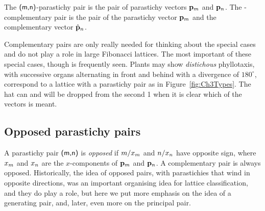\begin{definition}
The $\textsf{(m,n)}$-parastichy pair is the pair of parastichy vectors ${\mathbf p}_{m}$ and ${\mathbf p}_{n}$.
The -complementary pair is the pair of the parastichy vector ${\mathbf p}_{m}$ and the complementary vector $\hat{\mathbf p}_{n}$.
\label{def:pp}
\end{definition}
Complementary pairs are only really needed for thinking about the special cases  and do not play a role in large Fibonacci lattices. The most important of these special cases, though is frequently seen. Plants may show \textit{distichous} phyllotaxis, with successive organs  alternating in front and behind with a divergence of $180^\circ$, correspond to a lattice with a  parastichy pair as in Figure~\ref{fig:Ch3Types}. The  hat can and will be dropped from the second \textsf{1} when it is clear which of the vectors is meant. 

\clearpage
\subsection{Opposed parastichy pairs}

A parastichy pair $\textsf{(m,n)}$ is \emph{opposed} if $m/x_m$ and $n/x_n$ have opposite sign, where $x_m$ and $x_n$ are the $x$-components of ${\mathbf p}_{m}$ and ${\mathbf p}_{n}$. A complementary pair  is always opposed. 
 Historically, the idea of opposed pairs, with parastichies that wind in opposite directions, was an important organising idea for lattice classification, and they do play a role, but here we put more emphasis on the idea of a {generating pair}, and, later,  even more on the principal pair. 




